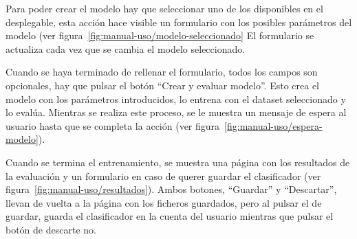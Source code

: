 
Para poder crear el modelo hay que seleccionar uno de los disponibles en el 
desplegable, esta acción hace visible un formulario con los posibles parámetros 
del modelo (ver figura~\ref{fig:manual-uso/modelo-seleccionado} El 
formulario se actualiza cada vez que se cambia el modelo seleccionado.


Cuando se haya terminado de rellenar el formulario, todos los campos son 
opcionales, hay que pulsar el botón ``Crear y evaluar modelo''. Esto crea el 
modelo con los parámetros introducidos, lo entrena con el dataset seleccionado 
y lo evalúa. Mientras se realiza este proceso, se le muestra un mensaje de 
espera al usuario hasta que se completa la acción (ver 
figura~\ref{fig:manual-uso/espera-modelo}).


Cuando se termina el entrenamiento, se muestra una página con los resultados de 
la evaluación y un formulario en caso de querer guardar el clasificador (ver 
figura~\ref{fig:manual-uso/resultados}). Ambos botones, ``Guardar'' y 
``Descartar'', llevan de vuelta a la página con los ficheros guardados, pero al 
pulsar el de guardar, guarda el clasificador en la cuenta del usuario mientras 
que pulsar el botón de descarte no.


